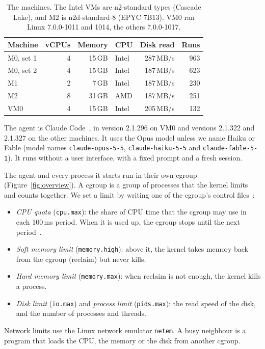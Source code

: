 \documentclass[sigconf,review,anonymous]{acmart}
\begin{document}
\begin{table}[t]
\caption{The machines. The Intel
VMs are n2-standard types (Cascade Lake), and M2 is n2d-standard-8 (EPYC
7B13). VM0 ran Linux 7.0.0-1011 and 1014, the others 7.0.0-1017.}
\label{tab:machines}
\small
\begin{tabular}{@{}lrrlrr@{}}
\toprule
Machine & vCPUs & Memory & CPU & Disk read & Runs \\
\midrule
M0, set 1 & 4 & 15\,GB & Intel & 287\,MB/s & 963 \\
M0, set 2 & 4 & 15\,GB & Intel & 187\,MB/s & 623 \\
M1 & 2 & 7\,GB & Intel & 187\,MB/s & 230 \\
M2 & 8 & 31\,GB & AMD & 187\,MB/s & 251 \\
VM0 & 4 & 15\,GB & Intel & 205\,MB/s & 132 \\
\bottomrule
\end{tabular}
\end{table}



The agent is Claude Code~\cite{claudecode}, in version 2.1.296 on VM0
and versions 2.1.322 and 2.1.327 on the other machines. It uses the Opus
model unless we name Haiku or Fable (model names
\texttt{claude-opus-5-5}, \texttt{claude-haiku-5-5} and
\texttt{claude-fable-5-1}). It runs without a user interface,
with a fixed prompt and a fresh session.

The agent and every process it starts run in their own cgroup
(Figure~\ref{fig:overview}). A cgroup is a group of processes that the
kernel limits and counts together. We set a limit by writing one of the
cgroup's control files~\cite{cgroupv2}:
\begin{itemize}
\item \emph{CPU quota} (\texttt{cpu.max}): the share of CPU time that
  the cgroup may use in each 100\,ms period. When it is used up, the
  cgroup stops until the next period~\cite{turner2010}.
\item \emph{Soft memory limit} (\texttt{memory.high}): above it, the
  kernel takes memory back from the cgroup (reclaim) but never kills.
\item \emph{Hard memory limit} (\texttt{memory.max}): when reclaim
  is not enough, the kernel kills a process.
\item \emph{Disk limit} (\texttt{io.max}) and \emph{process limit}
  (\texttt{pids.max}): the read speed of the disk, and the number of
  processes and threads.
\end{itemize}
Network limits use the Linux network emulator \texttt{netem}. A busy
neighbour is a program that loads the CPU, the memory or the disk from
another cgroup.
\end{document}

